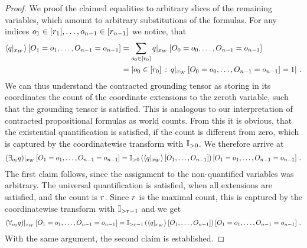 \begin{proof}
    We proof the claimed equalities to arbitrary slices of the remaining variables, which amount to arbitrary substitutions of the formulas.
    For any indices $o_{1}\in[r_{1}],\ldots,o_{n-1}\in[r_{n-1}]$ we notice, that
    \begin{align*}
        \left\langle {q}|_{x_{W}}\right\rangle \left[ O_{1}=o_{1},\ldots,O_{n-1}=o_{n-1} \right]
        &= \sum_{o_{0}\in[r_{0}]} {q}|_{x_{W}} \left[O_{0}=o_{0},\ldots,O_{n-1}=o_{n-1}\right] \\
        &= \left|o_{0}\in[r_{0}] \, : \, {q}|_{x_{W}} \left[O_{0}=o_{0},\ldots,O_{n-1}=o_{n-1}\right]=1\right| \, .
    \end{align*}
    We can thus understand the contracted grounding tensor as storing in its coordinates the count of the coordinate extensions to the zeroth variable, such that the grounding tensor is satisfied.
    This is analogous to our interpretation of contracted propositional formulas as world counts.
    From this it is obvious, that the existential quantification is satisfied, if the count is different from zero, which is captured by the coordinatewise transform with $\mathbb{I}_{>0}$.
    We therefore arrive at
    \begin{align*}
        {\left(\exists_{o_{0}}q\right)}|_{x_{W}} \left[O_{1}=o_{1},\ldots,O_{n-1}=o_{n-1}\right] =
        {\mathbb{I}_{>0}}\left(\left\langle {q}|_{x_{W}}\right\rangle \left[ O_{1},\ldots,O_{n-1} \right]\right)\left[O_{1}=o_{1},\ldots,O_{n-1}=o_{n-1}\right] \, .
    \end{align*}
    The first claim follows, since the assignment to the non-quantified variables was arbitrary.
    The universal quantification is satisfied, when all extensions are satisfied, and the count is $r$.
    Since $r$ is the maximal count, this is captured by the coordinatewise transform with $\mathbb{I}_{>r-1}$ and we get
    \begin{align*}
        {\left(\forall_{o_{0}}q\right)}|_{x_{W}} \left[O_{1}=o_{1},\ldots,O_{n-1}=o_{n-1}\right] =
        {\mathbb{I}_{>r-1}}\left(\left\langle {q}|_{x_{W}}\right\rangle \left[ O_{1},\ldots,O_{n-1} \right]\right)\left[O_{1}=o_{1},\ldots,O_{n-1}=o_{n-1}\right] \, .
    \end{align*}
    With the same argument, the second claim is established.
\end{proof}

